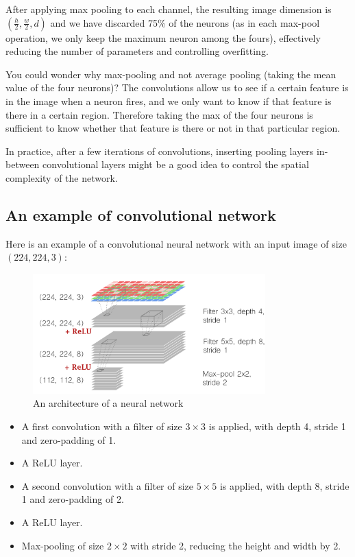 After applying max pooling to each channel, the resulting image dimension is $(\frac{h}{2}, \frac{w}{2}, d)$ and we have discarded 75\% of the neurons (as in each max-pool operation, we only keep the maximum neuron among the fours), effectively reducing the number of parameters and controlling overfitting.

You could wonder why max-pooling and not average pooling (taking the mean value of the four neurons)? The convolutions allow us to see if a certain feature is in the image when a neuron fires, and we only want to know if that feature is there in a certain region. Therefore taking the max of the four neurons is sufficient to know whether that feature is there or not in that particular region.

In practice, after a few iterations of convolutions, inserting pooling layers in-between convolutional layers might be a good idea to control the spatial complexity of the network.

\subsection{An example of convolutional network}
Here is an example of a convolutional neural network with an input image of size $(224, 224, 3)$:

\begin{figure}[H]
\centering
\includegraphics[width=0.8\textwidth]{Images/conv_archi.png}
\caption{An architecture of a neural network \cite{gorner}}
\end{figure}

\begin{itemize}
    \item A first convolution with a filter of size $3\times3$ is applied, with depth 4, stride 1 and zero-padding of 1.
    \item A ReLU layer.
    \item A second convolution with a filter of size $5\times5$ is applied, with depth 8, stride 1 and zero-padding of 2.
    \item A ReLU layer.
    \item Max-pooling of size $2\times2$ with stride 2, reducing the height and width by 2.
\end{itemize}

